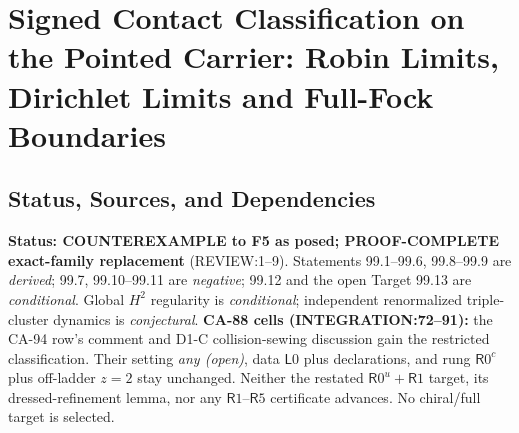 
\section{Signed Contact Classification on the Pointed Carrier: Robin Limits, Dirichlet Limits and Full-Fock Boundaries}
\label{sec:contact-classification}

\subsection{Status, Sources, and Dependencies}

\textbf{Status: COUNTEREXAMPLE to F5 as posed; PROOF-COMPLETE exact-family replacement}
(REVIEW:1--9). Statements 99.1--99.6, 99.8--99.9 are \emph{derived};
99.7, 99.10--99.11 are \emph{negative}; 99.12 and the open Target 99.13 are \emph{conditional}.
Global \(H^2\) regularity is \emph{conditional}; independent renormalized triple-cluster dynamics is \emph{conjectural}.
\textbf{CA-88 cells (INTEGRATION:72--91):} the CA-94 row's comment and D1-C collision-sewing discussion gain
the restricted classification. Their setting \emph{any (open)}, data \(\mathsf L0\) plus declarations, and rung
\(\mathsf R0^c\) plus off-ladder \(z=2\) stay unchanged. Neither the restated \(\mathsf R0^u+\mathsf R1\) target,
its dressed-refinement lemma, nor any \(\mathsf R1\)--\(\mathsf R5\) certificate advances. No chiral/full target is selected.

